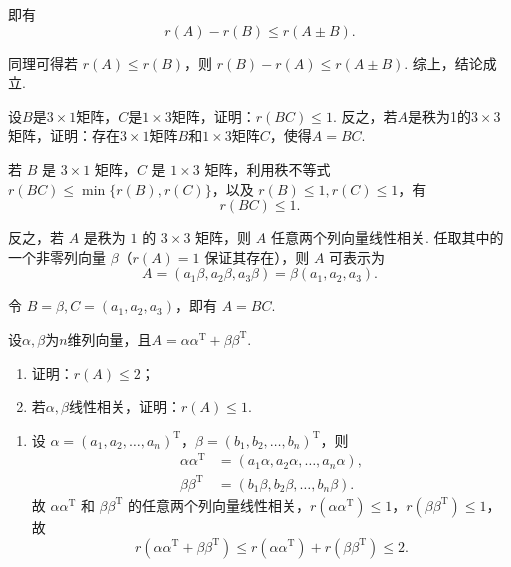 \begin{exercise}
\begin{exgroup}
\begin{answer}
            即有
            \[
                r(A) - r(B) \leqslant r(A \pm B).
            \]

            同理可得若 $r(A) \leqslant r(B)$，则 $r(B) - r(A) \leqslant r(A \pm B)$. 综上，结论成立.

        \end{answer}

        \item 设$B$是$3 \times 1$矩阵，$C$是$1 \times 3$矩阵，证明：$r(BC) \leqslant 1$. 反之，若$A$是秩为1的$3 \times 3$矩阵，证明：存在$3 \times 1$矩阵$B$和$1 \times 3$矩阵$C$，使得$A = BC$.
        \begin{answer}
            若 $B$ 是 $3 \times 1$ 矩阵，$C$ 是 $1 \times 3$ 矩阵，利用秩不等式 $r(BC) \leqslant \min\{r(B), r(C)\}$，以及 $r(B) \leqslant 1, r(C) \leqslant 1$，有
            \[
                r(BC) \leqslant 1.
            \]

            反之，若 $A$ 是秩为 $1$ 的 $3 \times 3$ 矩阵，则 $A$ 任意两个列向量线性相关. 任取其中的一个非零列向量 $\beta$（$r(A)=1$ 保证其存在），则 $A$ 可表示为
            \[
                A = (a_1 \beta, a_2 \beta, a_3 \beta) = \beta (a_1 , a_2 , a_3).
            \]

            令 $B = \beta, C = (a_1 , a_2 , a_3)$，即有 $A = BC$.

        \end{answer}

        \item 设$\alpha,\beta$为$n$维列向量，且$A=\alpha\alpha^\mathrm{T}+\beta\beta^\mathrm{T}$.
        \begin{enumerate}
            \item 证明：$r(A) \leqslant 2$；

            \item 若$\alpha,\beta$线性相关，证明：$r(A) \leqslant 1$.
        \end{enumerate}
        \begin{answer}
            \begin{enumerate}
                \item 设 $\alpha = (a_1, a_2, \ldots, a_n)^\mathrm{T}$，$\beta = (b_1, b_2, \ldots, b_n)^\mathrm{T}$，则
                    \begin{align*}
                        \alpha \alpha^\mathrm{T} &= (a_1 \alpha, a_2 \alpha, \ldots, a_n \alpha), \\
                        \beta \beta^\mathrm{T} &= (b_1 \beta, b_2 \beta, \ldots, b_n \beta).
                    \end{align*}
                    故 $\alpha \alpha^\mathrm{T}$ 和 $\beta \beta^\mathrm{T}$ 的任意两个列向量线性相关，$r\left(\alpha \alpha^\mathrm{T}\right) \leqslant 1$，$r\left(\beta \beta^\mathrm{T}\right) \leqslant 1$，故
                    \[
                        r\left(\alpha \alpha^\mathrm{T} + \beta \beta^\mathrm{T}\right) \leqslant r\left(\alpha \alpha^\mathrm{T}\right) + r\left(\beta \beta^\mathrm{T}\right) \leqslant 2.
                    \]


\end{enumerate}
\end{answer}
\end{exgroup}
\end{exercise}
